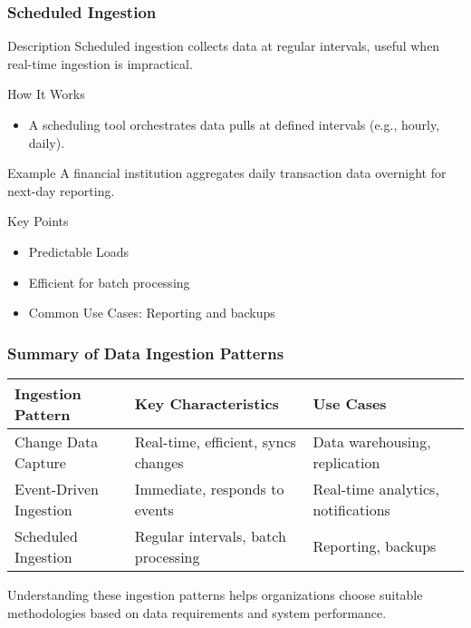 \documentclass{beamer}
\begin{document}
\begin{frame}[fragile]
    \frametitle{Scheduled Ingestion}
    \begin{block}{Description}
        Scheduled ingestion collects data at regular intervals, useful when real-time ingestion is impractical.
    \end{block}
    
    \begin{block}{How It Works}
        \begin{itemize}
            \item A scheduling tool orchestrates data pulls at defined intervals (e.g., hourly, daily).
        \end{itemize}
    \end{block}

    \begin{block}{Example}
        A financial institution aggregates daily transaction data overnight for next-day reporting.
    \end{block}
    
    \begin{block}{Key Points}
        \begin{itemize}
            \item Predictable Loads
            \item Efficient for batch processing
            \item Common Use Cases: Reporting and backups
        \end{itemize}
    \end{block}
\end{frame}

\begin{frame}[fragile]
    \frametitle{Summary of Data Ingestion Patterns}
    \begin{tabular}{|l|l|l|}
        \hline
        \textbf{Ingestion Pattern} & \textbf{Key Characteristics} & \textbf{Use Cases} \\
        \hline
        Change Data Capture       & Real-time, efficient, syncs changes & Data warehousing, replication \\
        \hline
        Event-Driven Ingestion    & Immediate, responds to events & Real-time analytics, notifications \\
        \hline
        Scheduled Ingestion        & Regular intervals, batch processing & Reporting, backups \\
        \hline
    \end{tabular}
    
    Understanding these ingestion patterns helps organizations choose suitable methodologies based on data requirements and system performance.
\end{frame}
\end{document}
